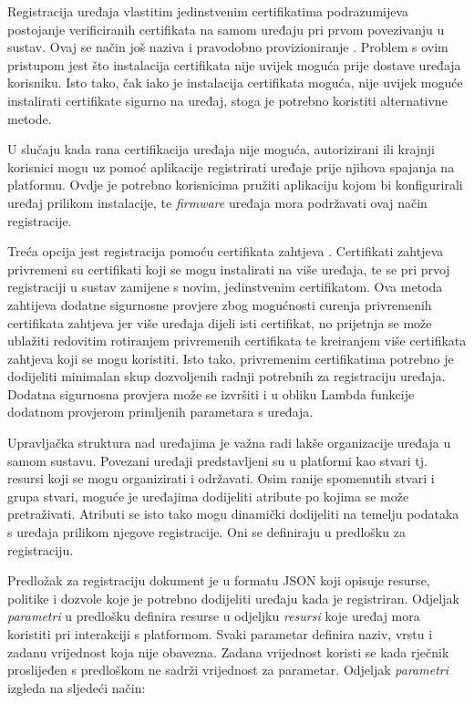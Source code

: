 Registracija uređaja vlastitim jedinstvenim certifikatima podrazumijeva postojanje verificiranih certifikata na samom uređaju pri prvom povezivanju u sustav. Ovaj se način još naziva i pravodobno provizioniranje . Problem s ovim pristupom jest što instalacija certifikata nije uvijek moguća prije dostave uređaja korisniku. Isto tako, čak iako je instalacija certifikata moguća, nije uvijek moguće instalirati certifikate sigurno na uređaj, stoga je potrebno koristiti alternativne metode. 

U slučaju kada rana certifikacija uređaja nije moguća, autorizirani ili krajnji korisnici  mogu uz pomoć aplikacije registrirati uređaje prije njihova spajanja na platformu. Ovdje je potrebno korisnicima pružiti aplikaciju kojom bi konfigurirali uređaj prilikom instalacije, te \textit{firmware} uređaja mora podržavati ovaj način registracije. 

Treća opcija jest registracija pomoću certifikata zahtjeva . Certifikati zahtjeva privremeni su certifikati koji se mogu instalirati na više uređaja, te se pri prvoj registraciji u sustav zamijene s novim, jedinstvenim certifikatom. Ova metoda zahtijeva dodatne sigurnosne provjere zbog mogućnosti curenja privremenih certifikata zahtjeva jer više uređaja dijeli isti certifikat, no prijetnja se može ublažiti redovitim rotiranjem privremenih certifikata te kreiranjem više certifikata zahtjeva koji se mogu koristiti. Isto tako, privremenim certifikatima potrebno je dodijeliti minimalan skup dozvoljenih radnji potrebnih za registraciju uređaja. Dodatna sigurnosna provjera može se izvršiti i u obliku Lambda funkcije dodatnom provjerom primljenih parametara s uređaja.

Upravljačka struktura nad uređajima je važna radi lakše organizacije uređaja u samom sustavu. Povezani uređaji predstavljeni su u platformi kao stvari tj. resursi koji se mogu organizirati i održavati. Osim ranije spomenutih stvari i grupa stvari, moguće je uređajima dodijeliti atribute po kojima se može pretraživati. Atributi se isto tako mogu dinamički dodijeliti na temelju podataka s uređaja prilikom njegove registracije. Oni se definiraju u predlošku za registraciju. 

Predložak za registraciju dokument je u formatu JSON koji opisuje resurse, politike i dozvole koje je potrebno dodijeliti uređaju kada je registriran. Odjeljak \textit{parametri} u predlošku definira resurse u odjeljku \textit{resursi} koje uređaj mora koristiti pri interakciji s platformom. Svaki parametar definira naziv, vrstu i zadanu vrijednost koja nije obavezna. Zadana vrijednost koristi se kada rječnik proslijeđen s predloškom ne sadrži vrijednost za parametar. Odjeljak \textit{parametri} izgleda na sljedeći način:

